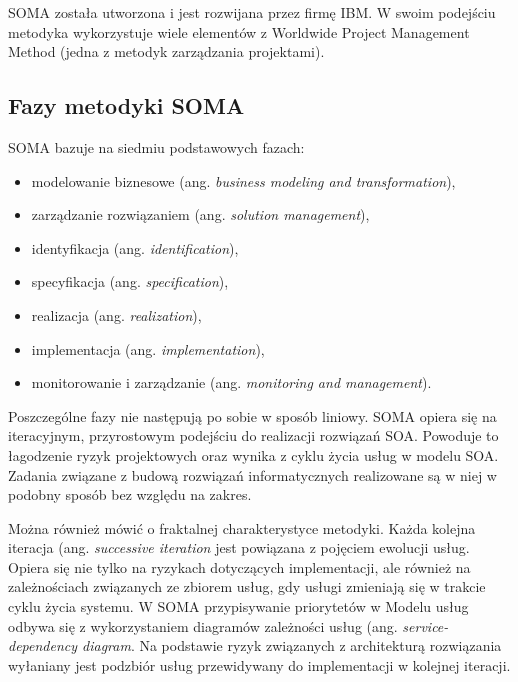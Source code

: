 SOMA została utworzona i jest rozwijana przez firmę IBM. W swoim podejściu metodyka wykorzystuje wiele elementów z Worldwide Project Management Method (jedna z metodyk zarządzania projektami). \cite{SOMAArsIBMJour}

\subsection{Fazy metodyki SOMA}
SOMA bazuje na siedmiu podstawowych fazach:
\begin{itemize}
\item{modelowanie biznesowe (ang. \textit{business modeling and transformation}),}
\item{zarządzanie rozwiązaniem (ang. \textit{solution management}),}
\item{identyfikacja (ang. \textit{identification}),}
\item{specyfikacja (ang. \textit{specification}),}
\item{realizacja (ang. \textit{realization}),}
\item{implementacja (ang. \textit{implementation}),}
\item{monitorowanie i zarządzanie (ang. \textit{monitoring and management}).}
\end{itemize}

Poszczególne fazy nie następują po sobie w sposób liniowy. SOMA opiera się na iteracyjnym, przyrostowym podejściu do realizacji rozwiązań SOA. Powoduje to łagodzenie ryzyk projektowych oraz wynika z cyklu życia usług w modelu SOA. Zadania związane z budową rozwiązań informatycznych realizowane są w niej w podobny sposób bez względu na zakres. 

Można również mówić o fraktalnej charakterystyce metodyki. Każda kolejna  iteracja (ang. \textit{successive iteration} jest powiązana z pojęciem ewolucji usług. Opiera się nie tylko na ryzykach dotyczących implementacji, ale również na zależnościach związanych ze zbiorem usług, gdy usługi zmieniają się w trakcie cyklu życia systemu. W SOMA przypisywanie priorytetów w Modelu usług odbywa się z wykorzystaniem diagramów zależności usług (ang. \textit{service-dependency diagram}. Na podstawie ryzyk związanych z architekturą rozwiązania wyłaniany jest podzbiór usług przewidywany do implementacji w kolejnej iteracji.

